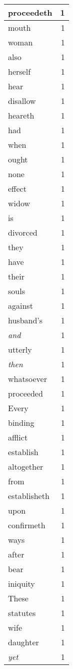 \begin{center}
\begin{longtable}{l|r}
proceedeth & 1\\ \hline 
mouth & 1\\ \hline 
woman & 1\\ \hline 
also & 1\\ \hline 
herself & 1\\ \hline 
hear & 1\\ \hline 
disallow & 1\\ \hline 
heareth & 1\\ \hline 
had & 1\\ \hline 
when & 1\\ \hline 
ought & 1\\ \hline 
none & 1\\ \hline 
effect & 1\\ \hline 
widow & 1\\ \hline 
is & 1\\ \hline 
divorced & 1\\ \hline 
they & 1\\ \hline 
have & 1\\ \hline 
their & 1\\ \hline 
souls & 1\\ \hline 
against & 1\\ \hline 
husband's & 1\\ \hline 
\emph{and} & 1\\ \hline 
utterly & 1\\ \hline 
\emph{then} & 1\\ \hline 
whatsoever & 1\\ \hline 
proceeded & 1\\ \hline 
Every & 1\\ \hline 
binding & 1\\ \hline 
afflict & 1\\ \hline 
establish & 1\\ \hline 
altogether & 1\\ \hline 
from & 1\\ \hline 
establisheth & 1\\ \hline 
upon & 1\\ \hline 
confirmeth & 1\\ \hline 
ways & 1\\ \hline 
after & 1\\ \hline 
bear & 1\\ \hline 
iniquity & 1\\ \hline 
These & 1\\ \hline 
statutes & 1\\ \hline 
wife & 1\\ \hline 
daughter & 1\\ \hline 
\emph{yet} & 1\\ \hline 
\end{longtable}
\end{center}



